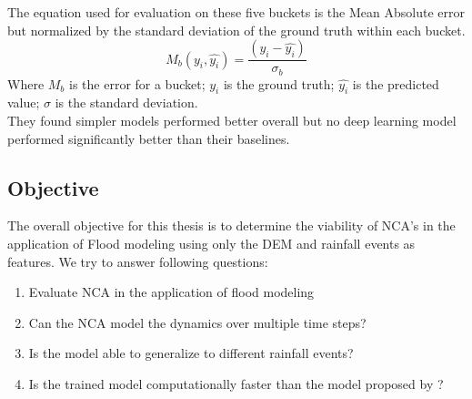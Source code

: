 The equation used for evaluation on these five buckets is the Mean Absolute error but normalized by the standard deviation of the ground truth within each bucket.
\begin{equation}
	M_{b}(y_{i}, \hat{y_{i}}) = \frac{(y_{i} -\hat{y_{i}})}{\sigma{}_{b}}
\end{equation}
Where $M_{b}$ is the error for a bucket; $y_{i}$ is the ground truth; $\hat{y_{i}}$ is the predicted value; $\sigma $ is the standard deviation. \\

They found simpler models performed better overall but no deep learning model performed significantly better than their baselines.


\subsection{Objective}
The overall objective for this thesis is to determine the viability of NCA's in the application of Flood modeling using only the DEM and rainfall events as features. We try to answer following questions:

\begin{enumerate}
	\item Evaluate NCA in the application of flood modeling 
	\item Can the NCA model the dynamics over multiple time steps?
	\item Is the model able to generalize to different rainfall events?
	\item Is the trained model computationally faster than the model proposed by \citeauthor{guidolin2016weighted}?
\end{enumerate}